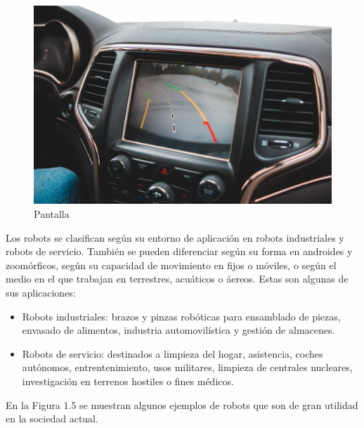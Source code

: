 \begin{figure}[H]
\begin{minipage}[b]{0.5\linewidth}
    \includegraphics[width=.65\linewidth]{chapters/images/pantalla.jpeg} 
    \caption{Pantalla} 
  \end{minipage} 
\end{figure}

Los robots se clasifican según su entorno de aplicación en robots industriales y robots de servicio. También se pueden diferenciar según su forma en androides y zoomórficos, según su capacidad de movimiento en fijos o móviles, o según el medio en el que trabajan en terrestres, acuáticos o áereos. Estas son algunas de sus aplicaciones:
\begin{itemize}
    \item Robots industriales: brazos y pinzas robóticas para ensamblado de piezas, envasado de alimentos, industria automovilística y gestión de almacenes.
    \item Robots de servicio: destinados a limpieza del hogar, asistencia, coches autónomos, entrentenimiento, usos militares, limpieza de centrales nucleares, investigación en terrenos hostiles o fines médicos.
\end{itemize} 

 En la Figura 1.5 se muestran algunos ejemplos de robots que son de gran utilidad en la sociedad actual. 

